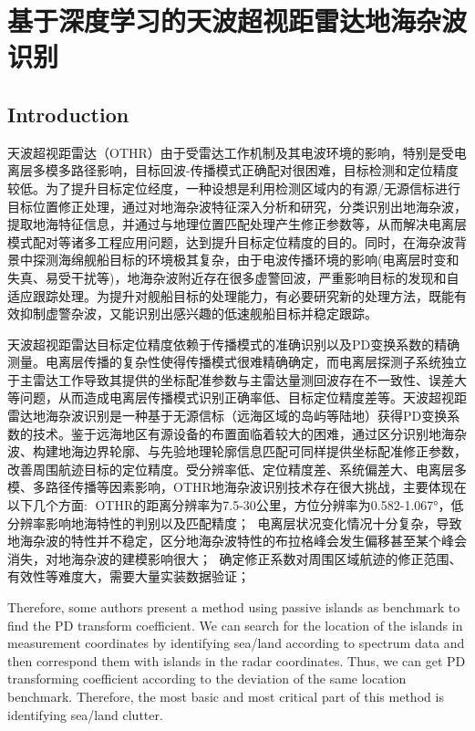 \chapter{基于深度学习的天波超视距雷达地海杂波识别}
\section{Introduction}
%
天波超视距雷达（OTHR）由于受雷达工作机制及其电波环境的影响，特别是受电离层多模多路径影响，目标回波-传播模式正确配对很困难，目标检测和定位精度较低。为了提升目标定位经度，一种设想是利用检测区域内的有源/无源信标进行目标位置修正处理，通过对地海杂波特征深入分析和研究，分类识别出地海杂波，提取地海特征信息，并通过与地理位置匹配处理产生修正参数等，从而解决电离层模式配对等诸多工程应用问题，达到提升目标定位精度的目的。同时，在海杂波背景中探测海绵舰船目标的环境极其复杂，由于电波传播环境的影响(电离层时变和失真、易受干扰等)，地海杂波附近存在很多虚警回波，严重影响目标的发现和自适应跟踪处理。为提升对舰船目标的处理能力，有必要研究新的处理方法，既能有效抑制虚警杂波，又能识别出感兴趣的低速舰船目标并稳定跟踪。

天波超视距雷达目标定位精度依赖于传播模式的准确识别以及PD变换系数的精确测量。电离层传播的复杂性使得传播模式很难精确确定，而电离层探测子系统独立于主雷达工作导致其提供的坐标配准参数与主雷达量测回波存在不一致性、误差大等问题，从而造成电离层传播模式识别正确率低、目标定位精度差等。天波超视距雷达地海杂波识别是一种基于无源信标（远海区域的岛屿等陆地）获得PD变换系数的技术。鉴于远海地区有源设备的布置面临着较大的困难，通过区分识别地海杂波、构建地海边界轮廓、与先验地理轮廓信息匹配可同样提供坐标配准修正参数，改善周围航迹目标的定位精度。受分辨率低、定位精度差、系统偏差大、电离层多模、多路径传播等因素影响，OTHR地海杂波识别技术存在很大挑战，主要体现在以下几个方面:	OTHR的距离分辨率为7.5-30公里，方位分辨率为0.582-1.067°，低分辨率影响地海特性的判别以及匹配精度；	电离层状况变化情况十分复杂，导致地海杂波的特性并不稳定，区分地海杂波特性的布拉格峰会发生偏移甚至某个峰会消失，对地海杂波的建模影响很大；	确定修正系数对周围区域航迹的修正范围、有效性等难度大，需要大量实装数据验证；

Therefore, some authors present a method using passive islands as benchmark to find the PD transform coefficient\cite{cuccoli2011coordinate}. We can search for the location of the islands in measurement coordinates by identifying sea/land according to spectrum data and then correspond them with islands in the radar coordinates. Thus, we can get PD transforming coefficient according to the deviation of the same location benchmark. Therefore, the most basic and most critical part of this method is identifying sea/land clutter.

